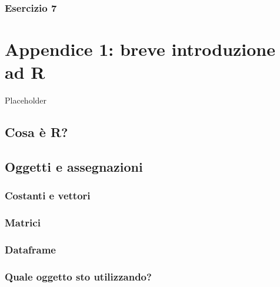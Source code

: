 \documentclass[a4paper,12pt,oneside]{book}
\begin{document}
\hypertarget{esercizio-7-2}{%
\subsection{Esercizio 7}\label{esercizio-7-2}}

\hypertarget{appendice-1-breve-introduzione-ad-r}{%
\chapter{Appendice 1: breve introduzione ad R}\label{appendice-1-breve-introduzione-ad-r}}

Placeholder

\hypertarget{cosa-uxe8-r}{%
\section*{Cosa è R?}\label{cosa-uxe8-r}}

\hypertarget{oggetti-e-assegnazioni}{%
\section*{Oggetti e assegnazioni}\label{oggetti-e-assegnazioni}}

\hypertarget{costanti-e-vettori}{%
\subsection*{Costanti e vettori}\label{costanti-e-vettori}}

\hypertarget{matrici}{%
\subsection*{Matrici}\label{matrici}}

\hypertarget{dataframe}{%
\subsection*{Dataframe}\label{dataframe}}

\hypertarget{quale-oggetto-sto-utilizzando}{%
\subsection*{Quale oggetto sto utilizzando?}\label{quale-oggetto-sto-utilizzando}}
\end{document}
